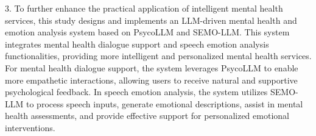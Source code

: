 \begin{abstract*}
3. To further enhance the practical application of intelligent mental health services, this study designs and implements an LLM-driven mental health and emotion analysis system based on PsycoLLM and SEMO-LLM. This system integrates mental health dialogue support and speech emotion analysis functionalities, providing more intelligent and personalized mental health services. For mental health dialogue support, the system leverages PsycoLLM to enable more empathetic interactions, allowing users to receive natural and supportive psychological feedback. In speech emotion analysis, the system utilizes SEMO-LLM to process speech inputs, generate emotional descriptions, assist in mental health assessments, and provide effective support for personalized emotional interventions.

\end{abstract*}
